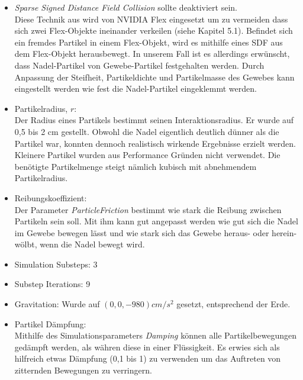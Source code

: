 \begin{itemize}

  \item \textit{Sparse Signed Distance Field Collision} sollte deaktiviert sein. \\ 
  Diese Technik aus wird von NVIDIA Flex eingesetzt um zu vermeiden dass sich zwei Flex-Objekte ineinander verkeilen (siehe \cite{UPP} Kapitel 5.1). Befindet sich ein fremdes Partikel in einem Flex-Objekt, wird es mithilfe eines \ac{SDF} aus dem Flex-Objekt herausbewegt. In unserem Fall ist es allerdings erwünscht, dass Nadel-Partikel von Gewebe-Partikel festgehalten werden. Durch Anpassung der Steifheit, Partikeldichte und Partikelmasse des Gewebes kann eingestellt werden wie fest die Nadel-Partikel eingeklemmt werden.    
    
     \item Partikelradius, $r$: \\ Der Radius eines Partikels bestimmt seinen Interaktionsradius. Er wurde auf 0,5 bis 2 cm gestellt. Obwohl die Nadel eigentlich deutlich dünner als die Partikel war, konnten dennoch realistisch wirkende Ergebnisse erzielt werden. Kleinere Partikel wurden aus Performance Gründen nicht verwendet. Die benötigte Partikelmenge steigt nämlich kubisch mit abnehmendem Partikelradius.
     
      \item Reibungskoeffizient: \\ Der Parameter \textit{ParticleFriction} bestimmt wie stark die Reibung zwischen Partikeln sein soll. Mit ihm kann gut angepasst werden wie gut sich die Nadel im Gewebe bewegen lässt und wie stark sich das Gewebe heraus- oder herein-wölbt, wenn die Nadel bewegt wird.
      
      \item Simulation Substeps:  3%
      
      \item Substep Iterations: 9%
      
      \item Gravitation: Wurde auf $(0 , 0 , -980) cm/s^2$ gesetzt, entsprechend der Erde.
      
      \item Partikel Dämpfung: \\ Mithilfe des Simulationsparameters \textit{Damping} können alle Partikelbewegungen gedämpft werden, als währen diese in einer Flüssigkeit. Es erwies sich als hilfreich etwas Dämpfung (0,1 bis 1) zu verwenden um das Auftreten von zitternden Bewegungen zu verringern.
      
\end{itemize}
    

